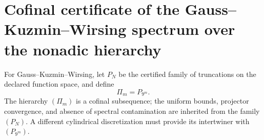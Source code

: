 \section{Cofinal certificate of the Gauss--Kuzmin--Wirsing spectrum over the nonadic hierarchy}
\label{sec:p3-final:cierre-gkw}

For Gauss--Kuzmin--Wirsing, let \(P_N\) be the certified family of
truncations on the declared function space, and define
\[
 \Pi_m=P_{9^m}.
\]
The hierarchy \((\Pi_m)\) is a cofinal subsequence; the uniform bounds,
projector convergence, and absence of spectral contamination are
inherited from the family \((P_N)\). A different cylindrical discretization must
provide its intertwiner with \((P_{9^m})\).
